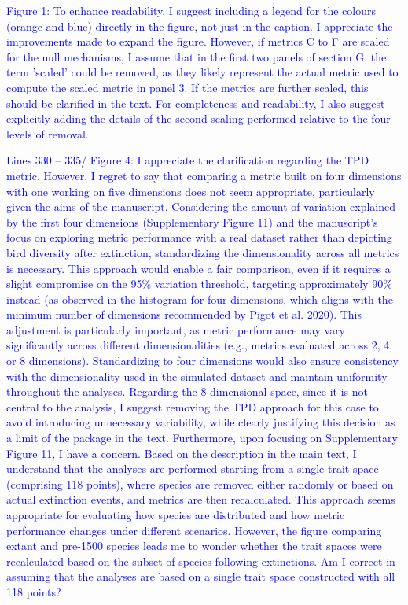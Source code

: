 \documentclass[
]{article}
\begin{document}
\textcolor{blue}{Figure 1: To enhance readability, I suggest including a legend for the colours (orange and blue) directly in the figure, not just in the caption. I appreciate the improvements made to expand the figure. However, if metrics C to F are scaled for the null mechanisms, I assume that in the first two panels of section G, the term 'scaled' could be removed, as they likely represent the actual metric used to compute the scaled metric in panel 3. If the metrics are further scaled, this should be clarified in the text. For completeness and readability, I also suggest explicitly adding the details of the second scaling performed relative to the four levels of removal.}

\textcolor{blue}{Lines 330 – 335/ Figure 4: I appreciate the clarification regarding the TPD metric. However, I regret to say that comparing a metric built on four dimensions with one working on five dimensions does not seem appropriate, particularly given the aims of the manuscript. Considering the amount of variation explained by the first four dimensions (Supplementary Figure 11) and the manuscript's focus on exploring metric performance with a real dataset rather than depicting bird diversity after extinction, standardizing the dimensionality across all metrics is necessary.  This approach would enable a fair comparison, even if it requires a slight compromise on the 95\% variation threshold, targeting approximately 90\% instead (as observed in the histogram for four dimensions, which aligns with the minimum number of dimensions recommended by Pigot et al. 2020). This adjustment is particularly important, as metric performance may vary significantly across different dimensionalities (e.g., metrics evaluated across 2, 4, or 8 dimensions). Standardizing to four dimensions would also ensure consistency with the dimensionality used in the simulated dataset and maintain uniformity throughout the analyses. Regarding the 8-dimensional space, since it is not central to the analysis, I suggest removing the TPD approach for this case to avoid introducing unnecessary variability, while clearly justifying this decision as a limit of the package in the text.
Furthermore, upon focusing on Supplementary Figure 11, I have a concern. Based on the description in the main text, I understand that the analyses are performed starting from a single trait space (comprising 118 points), where species are removed either randomly or based on actual extinction events, and metrics are then recalculated. This approach seems appropriate for evaluating how species are distributed and how metric performance changes under different scenarios. However, the figure comparing extant and pre-1500 species leads me to wonder whether the trait spaces were recalculated based on the subset of species following extinctions. Am I correct in assuming that the analyses are based on a single trait space constructed with all 118 points?}
\end{document}
